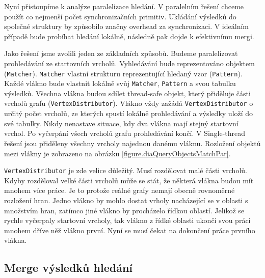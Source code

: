 Nyní přistoupíme k analýze paralelizace hledání.
V paralelním řešení chceme použít co nejmenší počet synchronizačních primitiv.
Ukládání výsledků do společné struktury by způsobilo značny overhead za synchronizaci.
V ideálním případě bude probíhat hledání lokálně, následně pak dojde k efektivnímu mergi.

Jako řešení jsme zvolili jeden ze základních způsobů.
Budeme paralelizovat prohledávání ze startovních vrcholů.
Vyhledávání bude reprezentováno objektem (\texttt{Matcher}).
\texttt{Matcher} vlastní strukturu reprezentující hledaný vzor (\texttt{Pattern}).
Každé vlákno bude vlastnit lokálně svůj \texttt{Matcher}, \texttt{Pattern} a svou tabulku výsledků.
Všechna vlákna budou sdílet thread-safe objekt, který přiděluje části vrcholů grafu (\texttt{VertexDistributor}).
Vlákno vždy zažádá \texttt{VertexDistributor} o určitý počet vrcholů, ze kterých spustí lokálně prohledávání a výsledky uloží do své tabulky.
Nikdy nenastave situace, kdy dva vlákna mají stejný startovní vrchol.
Po vyčerpání všech vrcholů grafu prohledávání končí.
V Single-thread řešení jsou přiděleny všechny vrcholy najednou danému vláknu. 
Rozložení objektů mezi vlákny je zobrazeno na obrázku \ref{figure.diaQueryObjectsMatchPar}. 

\texttt{VertexDistributor} je zde velice důležitý.
Musí rozdělovat malé části vrcholů.
Kdyby rozděloval velké části vrcholů může se stát, že některá vlákna budou mít mnohem více práce.
Je to protože reálné grafy nemají obecně rovnoměrné rozložení hran.
Jedno vlákno by mohlo dostat vrholy nacházející se v oblasti s množstvím hran, zatímco jiné vlákno by procházelo řídkou oblastí.
Jelikož se rychle vyčerpaly startovní vrcholy, tak vlákno z řídké oblasti ukončí svou práci mnohem dříve něž vlákno první.
Nyní se musí čekat na dokončení práce prvního vlákna.

\subsection{Merge výsledků hledání}

